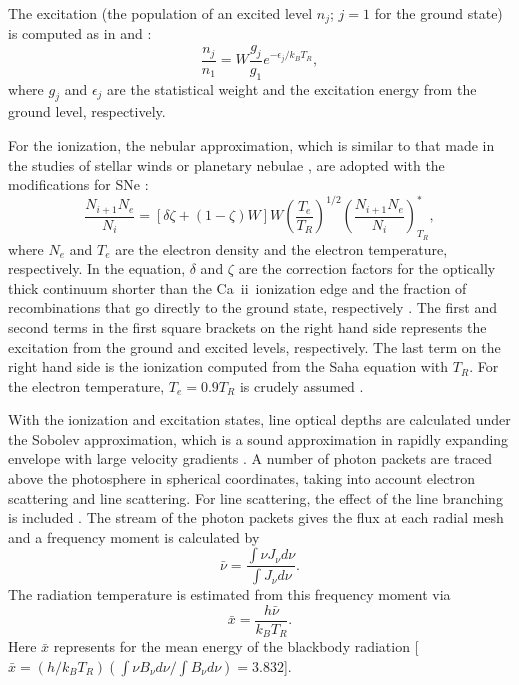 \documentclass[usegraphicx,usenatbib]{mn2e}
\newcommand{\CaII}{Ca~{\sc ii}}
\begin{document}
The excitation (the population of an excited level $n_j$; $j=1$ for the 
ground state) is computed as in \citet{abbott85} and \citet{lucy99}:
\begin{equation}
\frac{n_j}{n_1} = W \frac{g_j}{g_1} e^{-\epsilon_j /k_B T_R},
\label{eq:level}
\end{equation}
where $g_j$ and $\epsilon_j$ are the statistical weight  
and the excitation energy from the ground level, respectively.

For the ionization, the nebular approximation, which is similar to that made in
the studies of stellar winds \citep{lucy70, abbott85} or planetary nebulae
\citep{gurzadyan97}, are adopted with  the modifications for SNe
\citep{mazzalilucy93}:
\begin{equation}
\frac{N_{i+1}N_e}{N_i} 
= [\delta \zeta + (1-\zeta)W] W \left( \frac{T_e}{T_R} \right)^{1/2} 
 \left( \frac{N_{i+1}N_e}{N_i}  \right)^{*}_{T_R},
\label{eq:ion}
\end{equation}
where $N_e$ and $T_e$ are the electron density and the electron temperature,
respectively. In the equation, $\delta$ and $\zeta$ are the correction factors
for the optically thick continuum shorter than the \CaII\ ionization edge and
the fraction of recombinations that go directly to the ground state,
respectively \citep{mazzalilucy93}. The first and second terms in the first
square brackets on the right hand side represents the excitation from the ground
and excited levels, respectively. The last term on the right hand side is the
ionization computed from the Saha equation with $T_R$. For the electron
temperature, $T_e = 0.9 T_R$ is crudely assumed \citep{klein78,abbott85}.

With the ionization and excitation states, line optical depths are calculated
under the Sobolev approximation, which is a sound approximation in rapidly
expanding envelope with large velocity gradients \citep{castor70, lucy71}. A
number of photon packets are traced above the photosphere in spherical
coordinates, taking into account electron scattering and line scattering. For
line scattering, the effect of the line branching is included \citep{lucy99,
mazzali00, pinto00}. The stream of the photon packets gives the flux at each
radial mesh and a frequency moment is calculated by
\begin{equation}
\bar{\nu} = \frac{\int \nu J_{\nu} d\nu}{\int J_{\nu} d\nu}.
\end{equation}
The radiation temperature is estimated from this frequency moment via
\begin{equation}
\bar{x} = \frac{h\bar{\nu}}{k_B T_R}.
\end{equation}
Here $\bar{x}$ represents for the mean energy of the blackbody radiation
[$\bar{x} = (h/ k_B T_R)(\int \nu B_{\nu} d\nu/\int B_{\nu} d\nu) =  3.832$].
\end{document}
